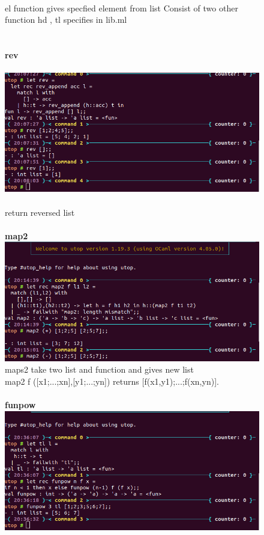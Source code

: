 \documentclass[15]{article}
\begin{document}
\begin{figure}
\\
el function gives specfied element from list
Consist of two other function hd , tl  specifies in lib.ml \\
\\
\\
\textbf{rev}\\
\\
\includegraphics[scale = .5]{images/image5.png}
\\
\\
return reversed list\\
\\
\textbf{map2}
\\
\includegraphics[scale = .5]{images/image3.png}
\\
maps2 take two list and function and gives new list\\
map2 f ([x1;...;xn],[y1;...;yn]) returns [f(x1,y1);...;f(xn,yn)].\\
\\
\textbf{funpow}
\\
\includegraphics[scale = .5]{images/image11.png}

\end{figure}
\end{document}
